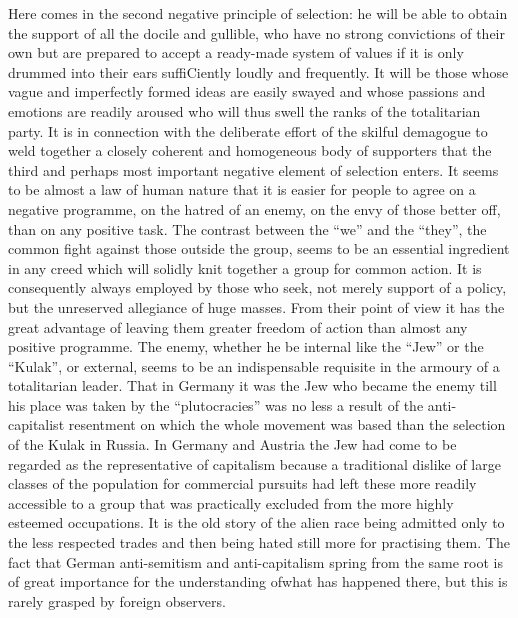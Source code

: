 \documentclass[11pt,openany]{book}
\begin{document}
Here comes in the second negative principle of selection: he will be able to obtain the support of all the docile and gullible, who have no strong convictions of their own but are prepared to accept a ready-made system of values if it is only drummed into their ears suffiCiently loudly and frequently. It will be those whose vague and imperfectly formed ideas are easily swayed and whose passions and emotions are readily aroused who will thus swell the ranks of the totalitarian party. It is in connection with the deliberate effort of the skilful demagogue to weld together a closely coherent and homogeneous body of supporters that the third and perhaps most important negative element of selection enters. It seems to be almost a law of human nature that it is easier for people to agree on a negative programme, on the hatred of an enemy, on the envy of those better off, than on any positive task. The contrast between the ``we'' and the ``they'', the common fight against those outside the group, seems to be an essential ingredient in any creed which will solidly knit together a group for common action. It is consequently always employed by those who seek, not merely support of a policy, but the unreserved allegiance of huge masses. From their point of view it has the great advantage of leaving them greater freedom of action than almost any positive programme. The enemy, whether he be internal like the ``Jew'' or the ``Kulak'', or external, seems to be an indispensable requisite in the armoury of a totalitarian leader. That in Germany it was the Jew who became the enemy till his place was taken by the ``plutocracies'' was no less a result of the anti-capitalist resentment on which the whole movement was based than the selection of the Kulak in Russia. In Germany and Austria the Jew had come to be regarded as the representative of capitalism because a traditional dislike of large classes of the population for commercial pursuits had left these more readily accessible to a group that was practically excluded from the more highly esteemed occupations. It is the old story of the alien race being admitted only to the less respected trades and then being hated still more for practising them. The fact that German anti-semitism and anti-capitalism spring from the same root is of great importance for the understanding ofwhat has happened there, but this is rarely grasped by foreign observers.

\begin{center}\textasteriskcentered\hspace{0.9em}\textasteriskcentered\hspace{0.9em}\textasteriskcentered\end{center}
\end{document}
